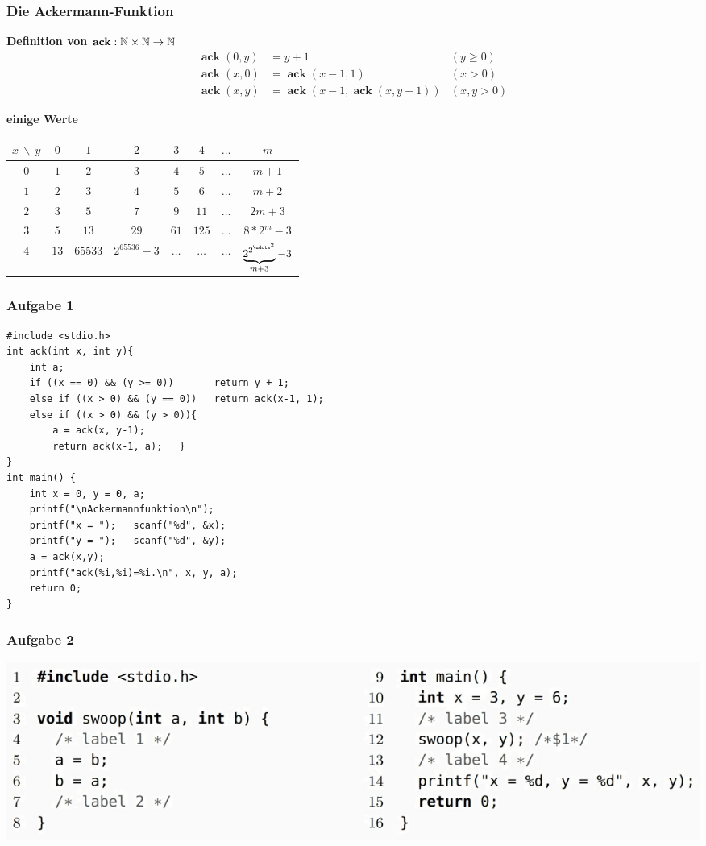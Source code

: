 \documentclass{beamer}
\DeclareMathOperator{\ack}{\mathbf{ack}}
\begin{document}
\begin{frame} \frametitle{Die Ackermann-Funktion}
\textbf{Definition von  $\ack : \N \times \N \to \N$}
	\begin{align*}
	\ack(0,y) &= y + 1 &(y \ge 0) \\
	\ack(x,0) &= \ack(x-1,1) &(x > 0)\\
	\ack(x,y) &= \ack(x-1,\ack(x,y-1)) &(x,y > 0)
	\end{align*}
	
	\textbf{einige Werte}
	
	\begin{small}
		\begin{tabular}{c||ccccccc}
			$x \ \backslash \ y$ & $0$ & $1$ & $2$ & $3$ & $4$ & $\dots$ & $m$ \\ \hline\hline
			$0$ & $1$ & $2$ & $3$ & $4$ & $5$ & $\dots$ & $m+1$ \\
			$1$ & $2$ & $3$ & $4$ & $5$ & $6$ & $\dots$ & $m+2$ \\
			$2$ & $3$ & $5$ & $7$ & $9$ & $11$ & $\dots$ & $2m+3$ \\
			$3$ & $5$ & $13$ & $29$ & $61$ & $125$ & $\dots$ & $8*2^m-3$ \\
			$4$ & $13$ & $65533$ & $2^{65536} -3$ & $\dots$ & $\dots$ & $\dots$ & $\underbrace{2^{2^{{\udots}^2}} }_{m+3}- 3$ 
		\end{tabular}
	\end{small}	
\end{frame}

\begin{frame}[fragile] \frametitle{Aufgabe 1}
	\footnotesize
\begin{lstlisting}
#include <stdio.h>
int ack(int x, int y){
	int a;
	if ((x == 0) && (y >= 0))       return y + 1;
	else if ((x > 0) && (y == 0))   return ack(x-1, 1);
	else if ((x > 0) && (y > 0)){
		a = ack(x, y-1);
		return ack(x-1, a);   }
}
int main() {
	int x = 0, y = 0, a;
	printf("\nAckermannfunktion\n");
	printf("x = ");   scanf("%d", &x);
	printf("y = ");   scanf("%d", &y);
	a = ack(x,y);
	printf("ack(%i,%i)=%i.\n", x, y, a);
	return 0;
}
\end{lstlisting}
\end{frame}

\begin{frame} \frametitle{Aufgabe 2}
	\centering
	\includegraphics[width=\textwidth]{./tut06_aufgabe2.jpg}
\end{frame}
\end{document}
